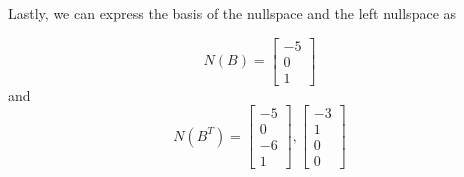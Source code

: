 Lastly, we can express the basis of the nullspace and the left nullspace as
\begin{mdframed}[style=MyFrame]
    \begin{equation}
        N(B) = 
        \begin{bmatrix}
            -5      \\
            0       \\
            1
        \end{bmatrix}
    \end{equation}
    and 
    \begin{equation}
        N(B^{T}) = 
        \begin{bmatrix}
            -5      \\
            0       \\
            -6      \\
            1
        \end{bmatrix},
        \begin{bmatrix}
            -3      \\
            1       \\
            0       \\
            0
        \end{bmatrix}
    \end{equation}
\end{mdframed}

